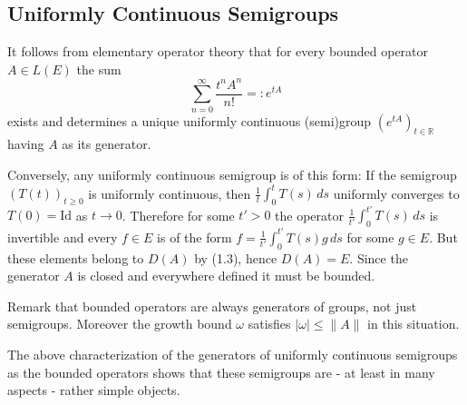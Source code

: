 \subsection{Uniformly Continuous Semigroups}\label{subsec:a1-2.1}

It follows from elementary operator theory that for every bounded operator $A \in L(E)$ the sum
\[
    \sum_{n=0}^{\infty} \frac{t^{n}A^{n}}{n!} =: e^{tA}
\]
exists and determines a unique uniformly continuous (semi)group $(e^{tA})_{t \in \mathbb{R}}$ having $A$ as its generator.

Conversely, any uniformly continuous semigroup is of this form: If the semigroup $(T(t))_{t \geq 0}$ is uniformly continuous, then $\frac{1}{t}\int_{0}^{t} T(s) \, ds$ uniformly converges to $T(0) = \text{Id}$ as $t \to 0$.
Therefore for some $t' > 0$ the operator $\frac{1}{t'}\int_{0}^{t'} T(s) \, ds$ is invertible and every $f \in E$ is of the form $f = \frac{1}{t'}\int_{0}^{t'} T(s)g \, ds$ for some $g \in E$.
But these elements belong to $D(A)$ by (1.3), hence $D(A) = E$.
Since the generator $A$ is closed and everywhere defined it must be bounded.

Remark that bounded operators are always generators of groups, not just semigroups.
Moreover the growth bound $\omega$ satisfies $|\omega| \leq \|A\|$ in this situation.

The above characterization of the generators of uniformly continuous semigroups as the bounded operators shows that these semigroups are - at least in many aspects - rather simple objects.

